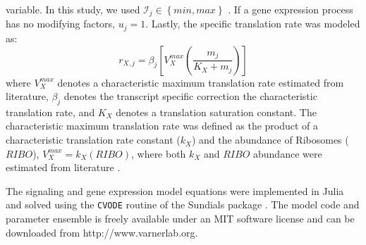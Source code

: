 \documentclass[12pt]{article}
\begin{document}
variable. In this study, we used $\mathcal{I}_{j}\in\left\{min,max\right\}$ \citep{pr3010178}.
If a gene expression process has no modifying factors, $u_{j}=1$.
Lastly, the specific translation rate was modeled as:
\begin{equation}
	r_{X,j} = \beta_{j}\left[V^{max}_{X}\left(\frac{m_{j}}{K_{X}+m_{j}}\right)\right]
\end{equation}where $V^{max}_{X}$ denotes a characteristic maximum translation rate estimated from literature, $\beta_{j}$ denotes the transcript specific correction the characteristic translation rate,
and $K_{X}$ denotes a translation saturation constant.
The characteristic maximum translation rate was defined as the product of a characteristic translation rate constant ($k_{X}$)
and the abundance of Ribosomes ($RIBO$), $V^{max}_{X} = k_{X}\left(RIBO\right)$, where both $k_{X}$ and $RIBO$ abundance were estimated from literature \citep{Milo:2010aa}.

The signaling and gene expression model equations were implemented in Julia and solved using the \texttt{CVODE} routine of the Sundials package \citep{Julia,Hindmarsh2005}.
The model code and parameter ensemble is freely available under an MIT software license and can be downloaded from http://www.varnerlab.org.
\end{document}
